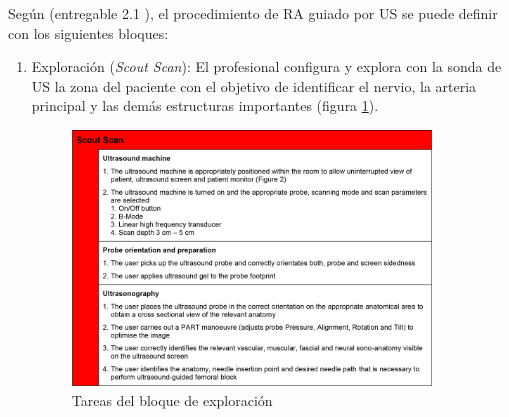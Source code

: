 Según (entregable 2.1 \cite{rasimasweb}), el procedimiento de \ac{RA} guiado por \ac{US} se puede definir con los siguientes bloques:
\begin{enumerate}
    \item Exploración (\emph{Scout Scan}): El profesional configura y explora con la sonda de \ac{US} la zona del paciente con el objetivo de identificar el nervio, la arteria principal y las demás estructuras importantes (figura \ref{fig:scoutscan}). 
\begin{figure}[th]
   \centering
    \includegraphics[width=0.9\textwidth]{IMG/scoutscan.png}
    \caption{Tareas del bloque de exploración }
   \label{fig:scoutscan}
   

\end{figure}
\end{enumerate}
